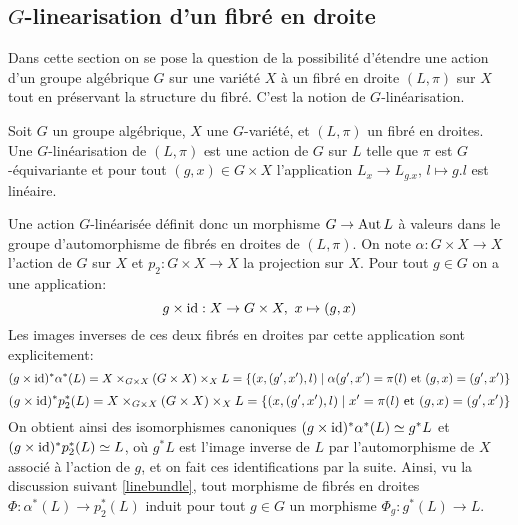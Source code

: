 \subsection{$G$-linearisation d'un fibré en droite}

Dans cette section on se pose la question de la possibilité d'étendre une action d'un groupe algébrique $G$ sur une variété $X$ à un fibré en droite $(L,\pi)$ sur $X$ tout en préservant la structure du fibré. C'est la notion de $G$-linéarisation. 

\begin{defn}[$G$-linéarisation]
Soit $G$ un groupe algébrique, $X$ une $G$-variété, et $(L,\pi)$ un fibré en droites. Une $G$-linéarisation de  $(L,\pi)$ est une action de $G$ sur $L$ telle que $\pi$ est $G$-équivariante et pour tout $(g,x)\in G\times X$ l'application $L_x\rightarrow L_{g.x},\, l\mapsto g.l$ est linéaire.
\end{defn}

Une action $G$-linéarisée définit donc un morphisme $G\rightarrow \operatorname{Aut} L$ à valeurs dans le groupe d'automorphisme de fibrés en droites de $(L,\pi)$. On note $\alpha: G\times X\rightarrow X$ l'action de $G$ sur $X$ et $p_2:G\times X\rightarrow X$ la projection sur $X$. Pour tout $g\in G$ on a une application:
$$g\times \operatorname{id}: X\rightarrow G\times X,\,\, x\mapsto (g,x)$$ 
Les images inverses de ces deux fibrés en droites par cette application sont explicitement: 
$$(g\times \operatorname{id})^*\alpha^*(L)=X\times_{G\times X}(G\times X)\times_X L=\lbrace (x,(g',x'),l)\mid \alpha(g',x')=\pi(l)\text{ et } (g,x)=(g',x')\rbrace$$
$$(g\times \operatorname{id})^*p_2^*(L)=X\times_{G\times X}(G\times X)\times_X L=\lbrace (x,(g',x'),l)\mid x'=\pi(l)\text{ et } (g,x)=(g',x')\rbrace$$
On obtient ainsi des isomorphismes canoniques $(g\times \operatorname{id})^*\alpha^*(L)\simeq g^*L$ et $(g\times \operatorname{id})^*p_2^*(L)\simeq L$, où $g^*L$ est l'image inverse de $L$ par l'automorphisme de $X$ associé à l'action de $g$, et on fait ces identifications par la suite. Ainsi, vu la discussion suivant \ref{linebundle}, tout morphisme de fibrés en droites $\Phi: \alpha^*(L)\rightarrow p_2^*(L)$ induit pour tout $g\in G$ un morphisme $\Phi_g:g^*(L)\rightarrow L$.

